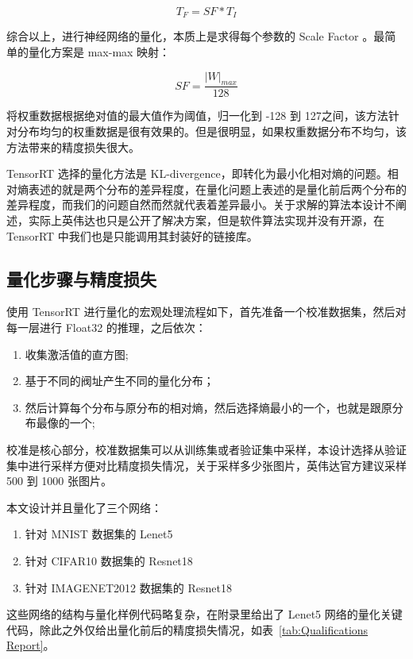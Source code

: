 $$ T_F = SF * T_I $$

综合以上，进行神经网络的量化，本质上是求得每个参数的 Scale Factor 。最简单的量化方案是 max-max 映射：

$$ SF = \frac{|W|_{max}}{128} $$

将权重数据根据绝对值的最大值作为阈值，归一化到 -128 到 127之间，该方法针对分布均匀的权重数据是很有效果的。但是很明显，如果权重数据分布不均匀，该方法带来的精度损失很大。

TensorRT 选择的量化方法是 KL-divergence，即转化为最小化相对熵的问题。相对熵表述的就是两个分布的差异程度，在量化问题上表述的是量化前后两个分布的差异程度，而我们的问题自然而然就代表着差异最小。关于求解的算法本设计不阐述，实际上英伟达也只是公开了解决方案，但是软件算法实现并没有开源，在 TensorRT 中我们也是只能调用其封装好的链接库。

\subsection{量化步骤与精度损失}

使用 TensorRT 进行量化的宏观处理流程如下，首先准备一个校准数据集，然后对每一层进行 Float32 的推理，之后依次：

\begin{enumerate}
    \item 收集激活值的直方图;
    \item 基于不同的阀址产生不同的量化分布；
    \item 然后计算每个分布与原分布的相对熵，然后选择熵最小的一个，也就是跟原分布最像的一个;
\end{enumerate}

校准是核心部分，校准数据集可以从训练集或者验证集中采样，本设计选择从验证集中进行采样方便对比精度损失情况，关于采样多少张图片，英伟达官方建议采样 500 到 1000 张图片。

本文设计并且量化了三个网络：

\begin{enumerate}
    \item 针对 MNIST 数据集的 Lenet5
    \item 针对 CIFAR10 数据集的 Resnet18
    \item 针对 IMAGENET2012 数据集的 Resnet18
\end{enumerate}

这些网络的结构与量化样例代码略复杂，在附录里给出了 Lenet5 网络的量化关键代码，除此之外仅给出量化前后的精度损失情况，如表~\ref{tab:Qualifications Report}。

